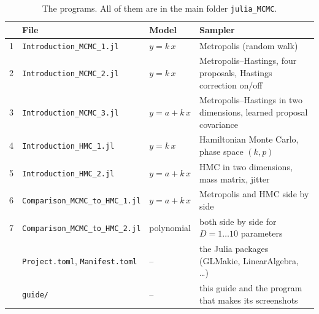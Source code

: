 \documentclass[11pt,a4paper]{article}
\newcommand{\file}[1]{\texttt{#1}}
\begin{document}
\begin{table}[H]
\centering\footnotesize\setlength{\tabcolsep}{4pt}
\caption{The programs. All of them are in the main folder \file{julia\_MCMC}.}\label{tab:files}
\begin{tabular}{@{}llll@{}}
\toprule
& File & Model & Sampler \\
\midrule
1 & \file{Introduction\_MCMC\_1.jl}        & $y=k\,x$     & Metropolis (random walk) \\
2 & \file{Introduction\_MCMC\_2.jl}        & $y=k\,x$     & Metropolis--Hastings, four proposals, Hastings correction on/off \\
3 & \file{Introduction\_MCMC\_3.jl}        & $y=a+k\,x$   & Metropolis--Hastings in two dimensions, learned proposal covariance \\
4 & \file{Introduction\_HMC\_1.jl}         & $y=k\,x$     & Hamiltonian Monte Carlo, phase space $(k,p)$ \\
5 & \file{Introduction\_HMC\_2.jl}         & $y=a+k\,x$   & HMC in two dimensions, mass matrix, jitter \\
6 & \file{Comparison\_MCMC\_to\_HMC\_1.jl} & $y=a+k\,x$   & Metropolis and HMC side by side \\
7 & \file{Comparison\_MCMC\_to\_HMC\_2.jl} & polynomial   & both side by side for $D=1\dots10$ parameters \\
\midrule
& \file{Project.toml}, \file{Manifest.toml} & -- & the Julia packages (GLMakie, LinearAlgebra, \dots) \\
& \file{guide/}                               & -- & this guide and the program that makes its screenshots \\
\bottomrule
\end{tabular}
\end{table}
\end{document}
